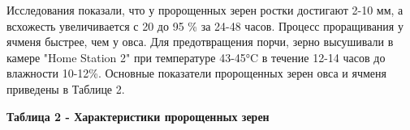 
Исследования показали, что у пророщенных зерен ростки достигают 2-10 мм,
а всхожесть увеличивается с 20 до 95 \% за 24-48 часов. Процесс
проращивания у ячменя быстрее, чем у овса. Для предотвращения порчи,
зерно высушивали в камере "Home Station 2" при температуре 43-45°C в
течение 12-14 часов до влажности 10-12\%. Основные показатели
пророщенных зерен овса и ячменя приведены в Таблице 2.

{\bfseries Таблица 2 - Характеристики пророщенных зерен}

